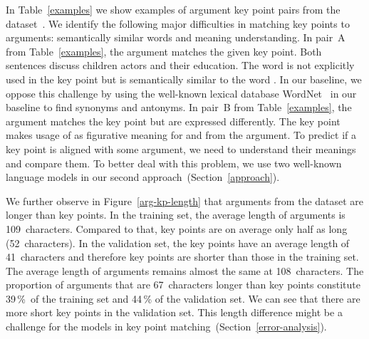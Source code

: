 In Table~\ref{examples} we show examples of argument key point pairs from the \ArgKP dataset~\cite{Bar-HaimEFKLS2020}. 
We identify the following major difficulties in matching key points to arguments: semantically similar words and meaning 
understanding.
In pair~A from Table~\ref{examples}, the argument matches the given key point. Both sentences discuss 
children actors and their education. The word  is not explicitly used in the key point but is 
semantically similar to the word . 
In our baseline, we oppose this challenge by using the well-known lexical database WordNet~\cite{Miller1995} in our 
baseline to find synonyms and antonyms.
In pair~B from Table~\ref{examples}, the argument matches the key point but are expressed differently. 
The key point makes usage of  as figurative meaning for  and  from the argument. 
To predict if a key point is aligned with some argument, we need to understand their meanings and compare them. 
To better deal with this problem, we use two well-known language models in our second approach~(Section~\ref{approach}). 

We further observe in Figure~\ref{arg-kp-length} that arguments from the \ArgKP dataset are longer than key points.
In the training set, the average length of arguments is 109~characters. 
Compared to that, key points are on average only half as long (52~characters). 
In the validation set, the key points have an average length of 41~characters and therefore key points are shorter than those in the training set. 
The average length of arguments remains almost the same at 108~characters. 
The proportion of arguments that are 67~characters longer than key points constitute 39\,\%~of the training set 
and 44\,\% of the validation set. 
We can see that there are more short key points in the validation set. 
This length difference might be a challenge for the models in key point matching~(Section~\ref{error-analysis}).
